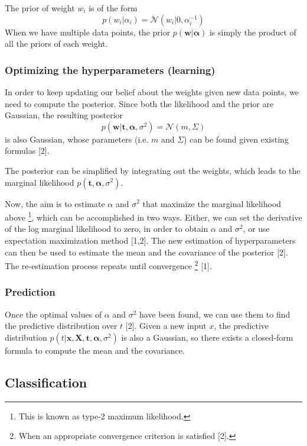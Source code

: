 The prior of weight $w_i$ is of the form
\begin{equation}
p(w_i|\alpha_i)=\mathcal{N}(w_i|0,\alpha_{i}^{-1})
\end{equation}
When we have multiple data points, the prior $p(\boldsymbol{w}|\boldsymbol{\alpha})$ is simply the product of all the priors of each weight.

\subsubsection{Optimizing the hyperparameters (learning)} In order to keep updating our belief about the weights given new data points, we need to compute the posterior. Since both the likelihood and the prior are Gaussian, the resulting posterior
\begin{equation}
p(\boldsymbol{w}|\boldsymbol{t}, \boldsymbol{\alpha}, \sigma^2)=\mathcal{N}(m,\Sigma)
\end{equation}
is also Gaussian, whose parameters (i.e. $m$ and $\Sigma$) can be found given existing formulas [2].

The posterior can be simplified by integrating out the weights, which leads to the marginal likelihood $p(\boldsymbol{t}, \boldsymbol{\alpha}, \sigma^2)$.

Now, the aim is to estimate $\alpha$ and $\sigma^2$ that maximize the marginal likelihood above \footnote{This is known as type-2 maximum likelihood.}, which can be accomplished in two ways. Either, we can set the derivative of the log marginal likelihood to zero, in order to obtain $\alpha$ and $\sigma^2$, or use expectation maximization method [1,2]. The new estimation of hyperparameters can then be used to estimate the mean and the covariance of the posterior [2]. The re-estimation process repeats until convergence \footnote{When an appropriate convergence criterion is satisfied [2]. } [1].

\subsubsection{Prediction}
Once the optimal values of $\alpha$ and $\sigma^2$ have been found, we can use them to find the predictive distribution over $t$ [2]. Given a new input $x$, the predictive distribution $p(t|\boldsymbol{x}, \boldsymbol{X}, \boldsymbol{t}, \boldsymbol{\alpha}, \sigma^2)$ is also a Gaussian, so there exists a closed-form formula to compute the mean and the covariance.

\subsection{Classification}


